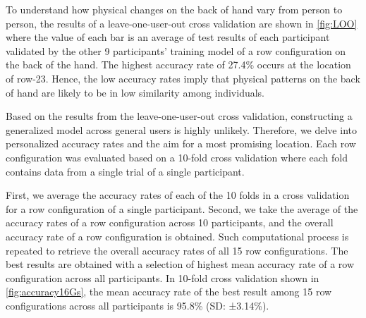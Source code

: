 \documentclass{sigchi}
\begin{document}
To understand how physical changes on the back of hand vary from person to person, the results of a leave-one-user-out cross validation are shown in \autoref{fig:LOO} where the value of each bar is an average of test results of each participant validated by the other 9 participants' training model of a row configuration on the back of the hand. The highest accuracy rate of 27.4\% occurs at the location of row-23. Hence, the low accuracy rates imply that physical patterns on the back of hand are likely to be in low similarity among individuals.

Based on the results from the leave-one-user-out cross validation, constructing a generalized model across general users is highly unlikely. Therefore, we delve into personalized accuracy rates and the aim for a most promising location.
Each row configuration was evaluated based on a 10-fold cross validation where each fold contains data from a single trial of a single participant.

First, we average the accuracy rates of each of the 10 folds in a cross validation for a row configuration of a single participant.
Second, we take the average of the accuracy rates of a row configuration across 10 participants, and the overall accuracy rate of a row configuration is obtained.
Such computational process is repeated to retrieve the overall accuracy rates of all 15 row configurations.
The best results are obtained with a selection of highest mean accuracy rate of a row configuration across all participants.
In 10-fold cross validation shown in \autoref{fig:accuracy16Gs}, the mean accuracy rate of the best result among 15 row configurations across all participants is 95.8\% (SD: ±3.14\%).
\end{document}
